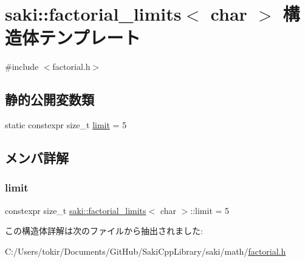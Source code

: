 \hypertarget{structsaki_1_1factorial__limits_3_01char_01_4}{}\section{saki\+:\+:factorial\+\_\+limits$<$ char $>$ 構造体テンプレート}
\label{structsaki_1_1factorial__limits_3_01char_01_4}


{\ttfamily \#include $<$factorial.\+h$>$}

\subsection*{静的公開変数類}
\begin{DoxyCompactItemize}
\item 
static constexpr size\+\_\+t \mbox{\hyperlink{structsaki_1_1factorial__limits_3_01char_01_4_a2502b6549e42673f75226ccc6d68a8eb}{limit}} = 5
\end{DoxyCompactItemize}


\subsection{メンバ詳解}
\mbox{\label{structsaki_1_1factorial__limits_3_01char_01_4_a2502b6549e42673f75226ccc6d68a8eb}} 
\subsubsection{\texorpdfstring{limit}{limit}}
{\footnotesize\ttfamily constexpr size\+\_\+t \mbox{\hyperlink{structsaki_1_1factorial__limits}{saki\+::factorial\+\_\+limits}}$<$ char $>$\+::limit = 5\hspace{0.3cm}{\ttfamily [static]}}



この構造体詳解は次のファイルから抽出されました\+:\begin{DoxyCompactItemize}
\item 
C\+:/\+Users/tokir/\+Documents/\+Git\+Hub/\+Saki\+Cpp\+Library/saki/math/\mbox{\hyperlink{factorial_8h}{factorial.\+h}}\end{DoxyCompactItemize}
